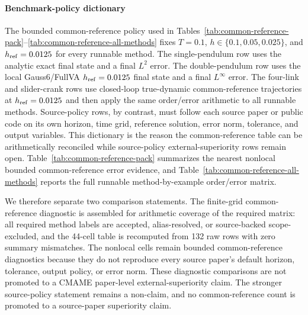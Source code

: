 \documentclass[preprint,12pt]{elsarticle}
\newcommand{\method}{Gauss6\slash FullVA}
\begin{document}
\paragraph{Benchmark-policy dictionary}
The bounded common-reference policy used in
Tables~\ref{tab:common-reference-pack}--\ref{tab:common-reference-all-methods}
fixes $T=0.1$, $h\in\{0.1,0.05,0.025\}$, and
$h_{\rm ref}=0.0125$ for every runnable method.  The single-pendulum row uses
the analytic exact final state and a final $L^2$ error.  The double-pendulum
row uses the local \method{} $h_{\rm ref}=0.0125$ final state and a final
$L^\infty$ error.  The four-link and slider-crank rows use closed-loop
true-dynamic common-reference trajectories at $h_{\rm ref}=0.0125$ and then
apply the same order/error arithmetic to all runnable methods.  Source-policy
rows, by contrast, must follow each source paper or public code on its own
horizon, time grid, reference solution, error norm, tolerance, and output
variables.  This dictionary is the reason the common-reference table can be
arithmetically reconciled while source-policy external-superiority rows remain
open.
Table~\ref{tab:common-reference-pack} summarizes the nearest nonlocal
bounded common-reference error evidence, and
Table~\ref{tab:common-reference-all-methods} reports the full runnable
method-by-example order/error matrix.

We therefore separate two comparison statements. The finite-grid
common-reference diagnostic is assembled for arithmetic coverage of the
required matrix: all required method labels are accepted, alias-resolved, or
source-backed scope-excluded, and the 44-cell table is recomputed from 132 raw
rows with zero summary mismatches. The nonlocal cells remain bounded
common-reference diagnostics because they do not reproduce every source
paper's default horizon, tolerance, output policy, or error norm. These
diagnostic comparisons are not promoted to a CMAME paper-level
external-superiority claim. The stronger source-policy statement remains a
non-claim, and no common-reference count is promoted to a source-paper
superiority claim.
\end{document}
